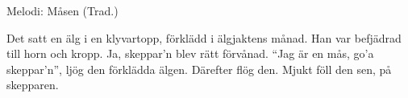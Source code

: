 \begin{song}

\begin{songmeta}
Melodi: Måsen (Trad.)
\end{songmeta}

\begin{songtext}
Det satt en älg i en klyvartopp,
förklädd i älgjaktens månad.
Han var befjädrad till horn och kropp.
Ja, skeppar'n blev rätt förvånad.
\textquotedblleft{}Jag är en mås, go'a skeppar'n\textquotedblright{}, ljög den
förklädda älgen. Därefter flög den.
Mjukt föll den sen,
på skepparen.
\end{songtext}
\end{song}
